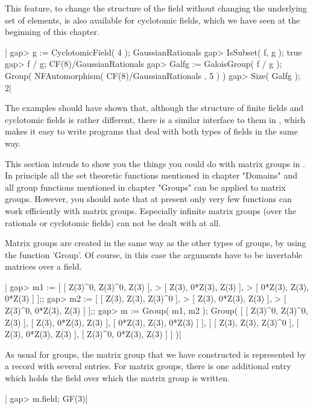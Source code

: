 This feature, to  change  the structure of the field without changing the
underlying  set  of elements,  is also  available for  cyclotomic fields,
which we have seen at the beginning of this chapter.

|    gap> g := CyclotomicField( 4 );
    GaussianRationals
    gap> IsSubset( f, g );
    true
    gap> f / g;
    CF(8)/GaussianRationals
    gap> Galfg := GaloisGroup( f / g );
    Group( NFAutomorphism( CF(8)/GaussianRationals , 5 ) )
    gap> Size( Galfg );
    2|

The examples should  have shown  that,  although the structure  of finite
fields and  cyclotomic  fields  is rather different, there  is a  similar
interface to them in {\GAP},  which  makes it easy to write programs that
deal with both types of fields in the same way.


This section intends to  show you  the  things  you  could do with matrix
groups in {\GAP}.  In principle all the set theoretic functions mentioned
in  chapter  "Domains"  and  all  group functions  mentioned  in  chapter
"Groups" can be applied to matrix groups.   However, you should note that
at  present only  very few  functions can  work  efficiently  with matrix
groups.   Especially  infinite  matrix  groups  (over  the  rationals  or
cyclotomic fields) can not be dealt with at all.

Matrix groups  are created in the same  way as the other types of groups,
by using the function 'Group'.  Of  course,  in this case  the  arguments
have to be invertable matrices over a field.

|    gap> m1 := [ [ Z(3)^0, Z(3)^0, Z(3) ],
    >             [ Z(3), 0*Z(3), Z(3) ],
    >             [ 0*Z(3), Z(3), 0*Z(3) ] ];;
    gap> m2 := [ [ Z(3), Z(3), Z(3)^0 ],
    >            [ Z(3), 0*Z(3), Z(3) ],
    >            [ Z(3)^0, 0*Z(3), Z(3) ] ];;
    gap> m := Group( m1, m2 );
    Group( [ [ Z(3)^0, Z(3)^0, Z(3) ], [ Z(3), 0*Z(3), Z(3) ],
      [ 0*Z(3), Z(3), 0*Z(3) ] ],
    [ [ Z(3), Z(3), Z(3)^0 ], [ Z(3), 0*Z(3), Z(3) ],
      [ Z(3)^0, 0*Z(3), Z(3) ] ] )|

As  usual for  groups,  the matrix  group  that  we  have  constructed is
represented  by  a record with several entries.  For matrix groups, there
is one additional entry which holds the field over which the matrix group
is written.

|    gap> m.field;
    GF(3)|

